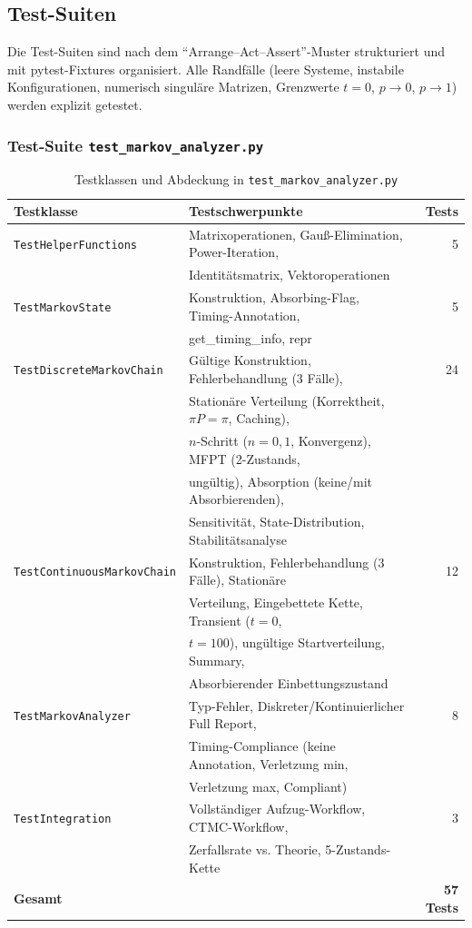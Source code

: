 ﻿\documentclass[a4paper,12pt]{scrreprt}
\theoremstyle{definition}
\begin{document}
\subsection{Test-Suiten}
\label{sec:tests-impl}

Die Test-Suiten sind nach dem ``Arrange--Act--Assert''-Muster strukturiert
und mit pytest-Fixtures organisiert. Alle Randfälle (leere Systeme,
instabile Konfigurationen, numerisch singuläre Matrizen, Grenzwerte $t=0$,
$p \to 0$, $p \to 1$) werden explizit getestet.

\subsubsection{Test-Suite \texttt{test\_markov\_analyzer.py}}

\begin{table}
	\centering
	\begin{tabular}{@{}llr@{}}
		\toprule
		\textbf{Testklasse} & \textbf{Testschwerpunkte} & \textbf{Tests} \\
		\midrule
		\texttt{TestHelperFunctions} & Matrixoperationen, Gauß-Elimination,
		Power-Iteration, & 5 \\
		& Identitätsmatrix, Vektoroperationen & \\
		\texttt{TestMarkovState} & Konstruktion, Absorbing-Flag,
		Timing-Annotation, & 5 \\
		& get\_timing\_info, repr & \\
		\texttt{TestDiscreteMarkovChain} & Gültige Konstruktion, Fehlerbehandlung
		(3 Fälle), & 24 \\
		& Stationäre Verteilung (Korrektheit, $\pi P=\pi$, Caching), & \\
		& $n$-Schritt ($n=0,1$, Konvergenz), MFPT (2-Zustands, & \\
		& ungültig), Absorption (keine/mit Absorbierenden), & \\
		& Sensitivität, State-Distribution, Stabilitätsanalyse & \\
		\texttt{TestContinuousMarkovChain} & Konstruktion, Fehlerbehandlung
		(3 Fälle), Stationäre & 12 \\
		& Verteilung, Eingebettete Kette, Transient ($t=0$, & \\
		& $t=100$), ungültige Startverteilung, Summary, & \\
		& Absorbierender Einbettungszustand & \\
		\texttt{TestMarkovAnalyzer} & Typ-Fehler, Diskreter/Kontinuierlicher
		Full Report, & 8 \\
		& Timing-Compliance (keine Annotation, Verletzung min, & \\
		& Verletzung max, Compliant) & \\
		\texttt{TestIntegration} & Vollständiger Aufzug-Workflow, CTMC-Workflow, & 3 \\
		& Zerfallsrate vs. Theorie, 5-Zustands-Kette & \\
		\midrule
		\textbf{Gesamt} & & \textbf{57 Tests} \\
		\bottomrule
	\end{tabular}
	\caption{Testklassen und Abdeckung in \texttt{test\_markov\_analyzer.py}}
	\label{tab:tests-markov}
\end{table}
\end{document}
